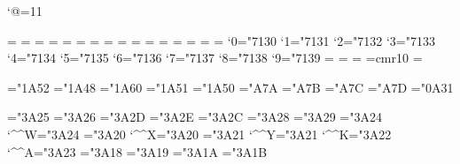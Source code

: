 
\catcode`@=11 %
\def\wlog#1{} %

\hsize=28pc
\vsize=45.25pc
\parindent=20pt
\baselineskip=13pt

\let\sc=\textcsc
\let\bf=\textbf
\def\textindent#1{\noindent\hbox to\parindent{\bf#1\hfil}\ignorespaces}
\def\exitem{\hangindent2\parindent \textindent}

=\mathtext
 =\mathsubtext
 =\mathsubsubtext
{}=\mathlet \let\tfont=\teni
 =\mathsublet
 =\mathsubsublet
{}=\mathsym
 =\mathsubsym
 =\mathsubsubsym
{}=\mathext
 =\mathsubext
 =\mathsubsubext
\def\rm{\fam\z@\textrm}
\def\it{\fam\itfam\textit} %
\def\sl{\textsl}
\textfont\itfam=\textit
\newfam\scrfam \ifnum{}\relax\else\error\fi %
\textfont\scrfam=\mathscr
 \scriptfont\scrfam=\mathsubscr
 \scriptscriptfont\scrfam=\mathsubsubscr
\def\scr{\fam8 }
\mathcode`0="7130
\mathcode`1="7131
\mathcode`2="7132
\mathcode`3="7133
\mathcode`4="7134
\mathcode`5="7135
\mathcode`6="7136
\mathcode`7="7137
\mathcode`8="7138
\mathcode`9="7139
\newfam\frfam %
\textfont\frfam=\mathfr
 \scriptfont\frfam=\mathsubfr
 \scriptscriptfont\frfam=\mathsubsubfr
\def\frak{\fam9 }
\newfam\euexfam %
\newfam\eqfam %
\font\teneq=cmr10 \textfont\eqfam=\teneq 

\mathchardef\intop="1A52
\mathchardef\ointop="1A48
\mathchardef\coprod="1A60
\mathchardef\prod="1A51
\mathchardef\sum="1A50
\mathchardef\braceld="A7A \mathchardef\bracerd="A7B
\mathchardef\bracelu="A7C \mathchardef\braceru="A7D
\mathchardef\infty="0A31

\mathchardef\nearrow="3A25
\mathchardef\searrow="3A26
\mathchardef\nwarrow="3A2D
\mathchardef\swarrow="3A2E
\mathchardef\Leftrightarrow="3A2C
\mathchardef\Leftarrow="3A28
\mathchardef\Rightarrow="3A29
\mathchardef\leftrightarrow="3A24 \mathcode`\^^W="3A24
\mathchardef\leftarrow="3A20 \let\gets=\leftarrow \mathcode`\^^X="3A20
\mathchardef\rightarrow="3A21 \let\to=\rightarrow \mathcode`\^^Y="3A21
\def\uparrow{\delimiter"3A22378 } \mathcode`\^^K="3A22
\def\downarrow{\delimiter"3A23379 } \mathcode`\^^A="3A23
\def\updownarrow{\delimiter"3A6C33F }
\def\Uparrow{\delimiter"3A2A37E }
\def\Downarrow{\delimiter"3A2B37F }
\def\Updownarrow{\delimiter"3A6D377 }
\mathchardef\leftharpoonup="3A18
\mathchardef\leftharpoondown="3A19
\mathchardef\rightharpoonup="3A1A
\mathchardef\rightharpoondown="3A1B

